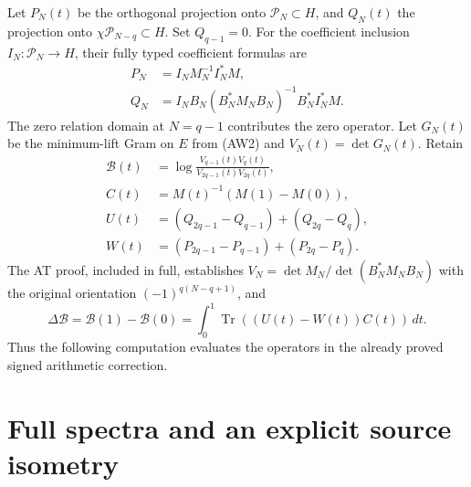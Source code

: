\documentclass[11pt,a4paper]{article}
\DeclareMathOperator{\Tr}{Tr}
\newcommand{\cP}{\mathcal P}
\begin{document}
Let $P_N(t)$ be the orthogonal projection onto $\cP_N\subset H$,
and $Q_N(t)$ the projection onto $\chi\cP_{N-q}\subset H$.
Set $Q_{q-1}=0$. For the coefficient inclusion $I_N:\cP_N\to H$,
their fully typed coefficient formulas are
\[
 \begin{aligned}
 P_N&=I_NM_N^{-1}I_N^*M,\\
 Q_N&=I_NB_N(B_N^*M_NB_N)^{-1}B_N^*I_N^*M.
 \end{aligned}
 \tag{AW4}
\]
The zero relation domain at $N=q-1$ contributes the zero operator.
Let $G_N(t)$ be the minimum-lift Gram on $E$ from (AW2) and
$V_N(t)=\det G_N(t)$. Retain
\[
 \begin{aligned}
 \mathcal B(t)&=\log\frac{V_{q-1}(t)V_q(t)}
                              {V_{2q-1}(t)V_{2q}(t)},\\
 C(t)&=M(t)^{-1}(M(1)-M(0)),\\
 U(t)&=(Q_{2q-1}-Q_{q-1})+(Q_{2q}-Q_q),\\
 W(t)&=(P_{2q-1}-P_{q-1})+(P_{2q}-P_q).
 \end{aligned}
 \tag{AW5}
\]
The AT proof, included in full, establishes
$V_N=\det M_N/\det(B_N^*M_NB_N)$ with the original orientation
$(-1)^{q(N-q+1)}$, and
\[
 \Delta\mathcal B=\mathcal B(1)-\mathcal B(0)
       =\int_0^1\Tr((U(t)-W(t))C(t))\,dt.
 \tag{AW6}
\]
Thus the following computation evaluates the operators in the
already proved signed arithmetic correction.

\section{Full spectra and an explicit source isometry}
\end{document}
